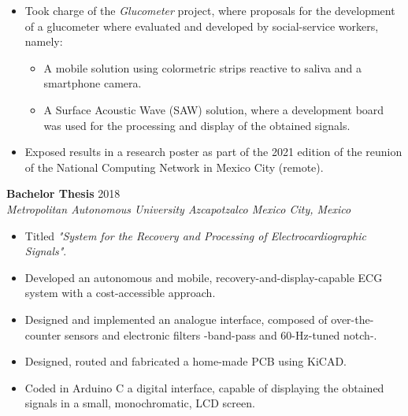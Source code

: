 \documentclass[10pt]{article}
\begin{document}
	\begin{minipage}{5.5in}
		\begin{itemize}
			\item Took charge of the \emph{Glucometer} project, where proposals
				for the development of a glucometer where evaluated and
				developed by social-service workers, namely:

				\begin{itemize}
					\item A mobile solution using colormetric strips reactive to
						saliva and a smartphone camera.

					\item A Surface Acoustic Wave (SAW) solution, where a
						development board was used for the processing and
						display of the obtained signals.
				\end{itemize}
			
			\item Exposed results in a research poster as part of the 2021
				edition of the reunion of the National Computing Network in
				Mexico City (remote).
		\end{itemize}
	\end{minipage}

	\vspace{3em}

	\noindent
	\textbf{Bachelor Thesis}
			\hfill 2018 \\
	\textit{Metropolitan Autonomous University Azcapotzalco
			\hfill Mexico City, Mexico}

	\vspace{2em}

	\begin{minipage}{5.5in}
		\begin{itemize}
			\item Titled \emph{"System for the Recovery and Processing of
				Electrocardiographic Signals"}.

			\item Developed an autonomous and mobile,
				recovery-and-display-capable ECG system with a cost-accessible
				approach.

			\item Designed and implemented an analogue interface, composed of
				over-the-counter sensors and electronic filters -band-pass and
				60-Hz-tuned notch-.

			\item Designed, routed and fabricated a home-made PCB using KiCAD.

			\item Coded in Arduino C a digital interface, capable of displaying
				the obtained signals in a small, monochromatic, LCD screen.
		\end{itemize}
	\end{minipage}
\end{document}
